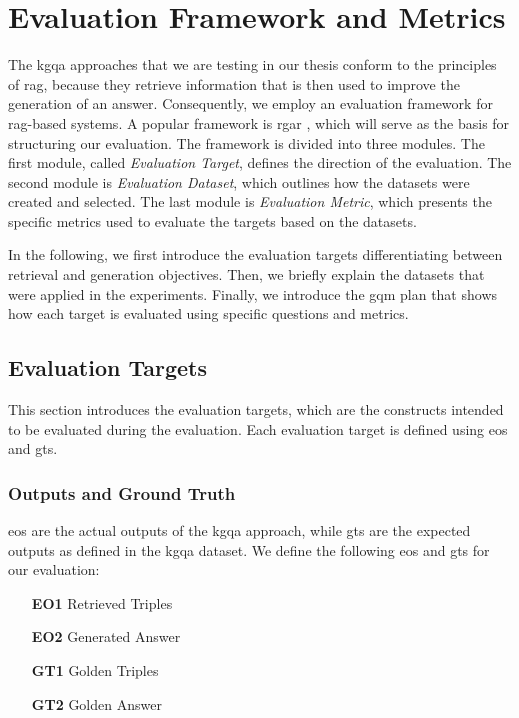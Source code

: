 
\section{Evaluation Framework and Metrics}
\label{sec:exp_prelim_evaluation_framework}

The \gls{kgqa} approaches that we are testing in our thesis conform to the principles of \gls{rag}, because they retrieve information that is then used to improve the generation of an answer. Consequently, we employ an evaluation framework for \gls{rag}-based systems. A popular framework is \gls{rgar} \cite{yu_evaluation_2024}, which will serve as the basis for structuring our evaluation. The framework is divided into three modules. The first module, called \emph{Evaluation Target}, defines the direction of the evaluation. The second module is \emph{Evaluation Dataset}, which outlines how the datasets were created and selected. The last module is \emph{Evaluation Metric}, which presents the specific metrics used to evaluate the targets based on the datasets. 

In the following, we first introduce the evaluation targets differentiating between retrieval and generation objectives. Then, we briefly explain the datasets that were applied in the experiments. Finally, we introduce the \gls{gqm} plan that shows how each target is evaluated using specific questions and metrics.


\subsection{Evaluation Targets}
\label{sec:evaluation_targets}

This section introduces the evaluation targets, which are the constructs intended to be evaluated during the evaluation. Each evaluation target is defined using \glspl{eo} and \glspl{gt}.

\subsubsection{Outputs and Ground Truth}

\glspl{eo} are the actual outputs of the \gls{kgqa} approach, while \glspl{gt} are the expected outputs as defined in the \gls{kgqa} dataset. We define the following \glspl{eo} and \glspl{gt} for our evaluation:

\begin{enumerate}[label={}, leftmargin=5em]
    \item[\textbf{EO1}] \label{enum:eo1} Retrieved Triples
    \item[\textbf{EO2}] \label{enum:eo2} Generated Answer
    \item[\textbf{GT1}] \label{enum:gt1} Golden Triples
    \item[\textbf{GT2}] \label{enum:gt2} Golden Answer
\end{enumerate}

